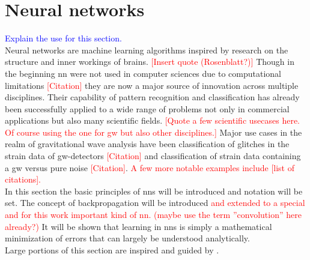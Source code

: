 \section{Neural networks}
\textcolor{blue}{Explain the use for this section.}\\
\noindent Neural networks are machine learning algorithms inspired by research on the structure and inner workings of brains. \textcolor{red}{[Insert quote (Rosenblatt?)]} Though in the beginning \gls{nn} were not used in computer sciences due to computational limitations \textcolor{red}{[Citation]} they are now a major source of innovation across multiple disciplines. Their capability of pattern recognition and classification has already been successfully applied to a wide range of problems not only in commercial applications but also many scientific fields. \textcolor{red}{[Quote a few scientific usecases here. Of course using the one for gw but also other disciplines.]} Major use cases in the realm of gravitational wave analysis have been classification of glitches in the strain data of \gls{gw}-detectors \textcolor{red}{[Citation]} and classification of strain data containing a \gls{gw} versus pure noise \textcolor{red}{[Citation]}. \textcolor{red}{A few more notable examples include [list of citations].}\\
In this section the basic principles of \gls{nns} will be introduced and notation will be set. The concept of backpropagation will be introduced \textcolor{red}{and extended to a special and for this work important kind of \gls{nn}. (maybe use the term ''convolution'' here already?)} It will be shown that learning in \gls{nns} is simply a mathematical minimization of errors that can largely be understood analytically.\medskip\\
Large portions of this section are inspired and guided by \cite{deep_learning_beginning, deep_learning_book}.

\begin{comment}
Neural networks have become a new and major player in data sciences over the past few years. They have proven to be very good at classification and interpolation. \textcolor{red}{[Insert ref]} Therefore and due to their computational efficiency they seem to be a compelling option even for scientific use cases and have been successfully applied to the classification and basic parameter estimation of \gls{gw}-data.\\
This sections aims to convey the basics of neural networks and the layers that are being utilized in this work. After having read this section it should be clear that neural networks are simply a mathematical model and that there is no magic involved. \textcolor{red}{(Maybe this is too prosa-like and/or should be put into the introduction)}
\end{comment}

